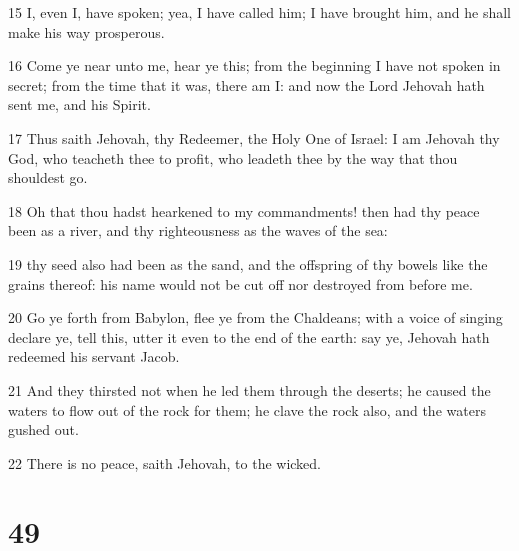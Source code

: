 \par 15 I, even I, have spoken; yea, I have called him; I have brought him, and he shall make his way prosperous.
\par 16 Come ye near unto me, hear ye this; from the beginning I have not spoken in secret; from the time that it was, there am I: and now the Lord Jehovah hath sent me, and his Spirit.
\par 17 Thus saith Jehovah, thy Redeemer, the Holy One of Israel: I am Jehovah thy God, who teacheth thee to profit, who leadeth thee by the way that thou shouldest go.
\par 18 Oh that thou hadst hearkened to my commandments! then had thy peace been as a river, and thy righteousness as the waves of the sea:
\par 19 thy seed also had been as the sand, and the offspring of thy bowels like the grains thereof: his name would not be cut off nor destroyed from before me.
\par 20 Go ye forth from Babylon, flee ye from the Chaldeans; with a voice of singing declare ye, tell this, utter it even to the end of the earth: say ye, Jehovah hath redeemed his servant Jacob.
\par 21 And they thirsted not when he led them through the deserts; he caused the waters to flow out of the rock for them; he clave the rock also, and the waters gushed out.
\par 22 There is no peace, saith Jehovah, to the wicked.

\chapter{49}

